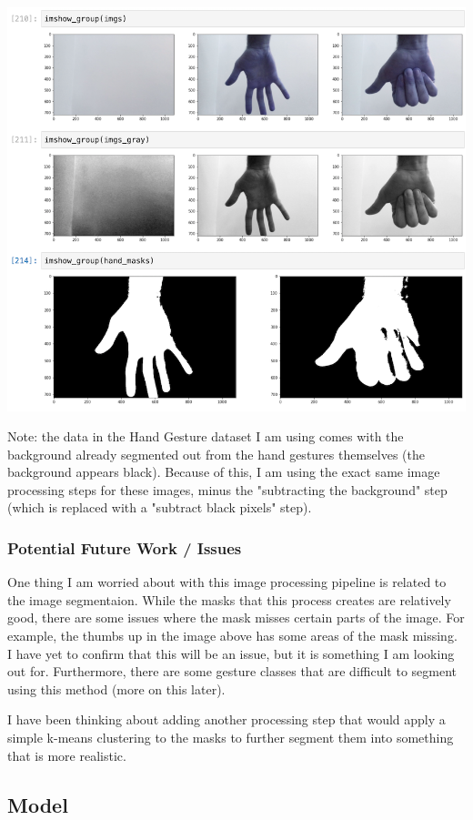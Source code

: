 \documentclass[9pt]{article}
\begin{document}
\includegraphics{img_process}

Note: the data in the Hand Gesture dataset I am using comes with the background already segmented out from the hand gestures themselves (the background appears black). Because of this, I am using the exact same image processing steps for these images, minus the "subtracting the background" step (which is replaced with a "subtract black pixels" step).

\subsubsection{Potential Future Work / Issues}
One thing I am worried about with this image processing pipeline is related to the image segmentaion. While the masks that this process creates are relatively good, there are some issues where the mask misses certain parts of the image. For example, the thumbs up in the image above has some areas of the mask missing. I have yet to confirm that this will be an issue, but it is something I am looking out for. Furthermore, there are some gesture classes that are difficult to segment using this method (more on this later).

I have been thinking about adding another processing step that would apply a simple k-means clustering to the masks to further segment them into something that is more realistic. 

\subsection{Model}
\end{document}
